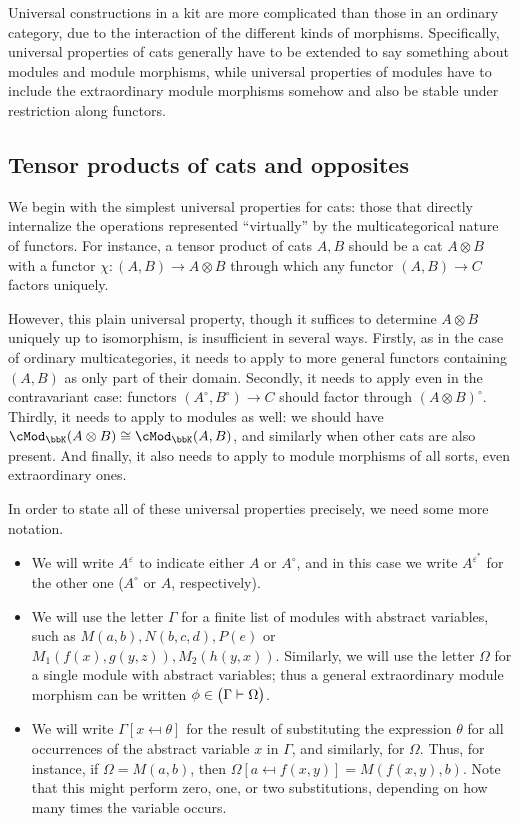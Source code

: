 \documentclass{amsart}
\newcommand{\K}{\bbK}
\let\mod\cMod
\def\modk{\mod_\K}
\renewcommand{\o}{^{\circ}}
\newcommand{\e}[1][]{^{\varepsilon_{#1}}}
\newcommand{\epbar}{^{\varepsilon^*}}
\let\mto\vdash    %
\def\mhom#1#2{\left( #1 \vphantom{\big|}\mto #2 \right)}
\newcommand{\subst}[3]{{#1}[#2 \mapsfrom #3]}
\begin{document}
Universal constructions in a kit are more complicated than those in an ordinary category, due to the interaction of the different kinds of morphisms.
Specifically, universal properties of cats generally have to be extended to say something about modules and module morphisms, while universal properties of modules have to include the extraordinary module morphisms somehow and also be stable under restriction along functors.

\subsection{Tensor products of cats and opposites}
\label{sec:tens-opp}

We begin with the simplest universal properties for cats: those that directly internalize the operations represented ``virtually'' by the multicategorical nature of functors.
For instance, a tensor product of cats $A,B$ should be a cat $A\otimes B$ with a functor $\chi:(A,B)\to A\otimes B$ through which any functor $(A,B)\to C$ factors uniquely.

However, this plain universal property, though it suffices to determine $A\otimes B$ uniquely up to isomorphism, is insufficient in several ways.
Firstly, as in the case of ordinary multicategories, it needs to apply to more general functors containing $(A,B)$ as only part of their domain.
Secondly, it needs to apply even in the contravariant case: functors $(A\o,B\o)\to C$ should factor through $(A\otimes B)\o$.
Thirdly, it needs to apply to modules as well: we should have $\modk(A\otimes B)\cong \modk(A,B)$, and similarly when other cats are also present.
And finally, it also needs to apply to module morphisms of all sorts, even extraordinary ones.

In order to state all of these universal properties precisely, we need some more notation.
\begin{itemize}
\item We will write $A\e$ to indicate either $A$ or $A\o$, and in this case we write $A\epbar$ for the other one ($A\o$ or $A$, respectively).
\item We will use the letter $\Gamma$ for a finite list of modules with abstract variables, such as $M(a,b),N(b,c,d),P(e)$ or $M_1(f(x),g(y,z)),M_2(h(y,x))$.
  Similarly, we will use the letter $\Omega$ for a single module with abstract variables; thus a general extraordinary module morphism can be written $\phi\in\mhom{\Gamma}{\Omega}$.
\item We will write $\subst\Gamma x \theta$ for the result of substituting the expression $\theta$ for all occurrences of the abstract variable $x$ in $\Gamma$, and similarly, for $\Omega$.
  Thus, for instance, if $\Omega = M(a,b)$, then $\subst\Omega a{f(x,y)} = M(f(x,y),b)$.
  Note that this might perform zero, one, or two substitutions, depending on how many times the variable occurs.
\end{itemize}
\end{document}
